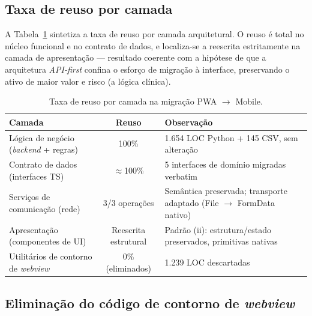 \subsection{Taxa de reuso por camada}

A Tabela~\ref{tab:taxa_reuso} sintetiza a taxa de reuso por camada
arquitetural. O reuso é total no núcleo funcional e no contrato de dados, e
localiza-se a reescrita estritamente na camada de apresentação --- resultado
coerente com a hipótese de que a arquitetura \emph{API-first} confina o esforço
de migração à interface, preservando o ativo de maior valor e risco (a lógica
clínica).

\begin{table}[H]
\centering
\caption{Taxa de reuso por camada na migração PWA $\rightarrow$ Mobile.}
\label{tab:taxa_reuso}
\footnotesize
\begin{tabular}{|p{4.6cm}|c|p{5.2cm}|}
\hline
\textbf{Camada} & \textbf{Reuso} & \textbf{Observação} \\ \hline
Lógica de negócio (\emph{backend} + regras) & 100\% & 1.654 LOC Python + 145 CSV, sem alteração \\ \hline
Contrato de dados (interfaces TS) & $\approx$100\% & 5 interfaces de domínio migradas verbatim \\ \hline
Serviços de comunicação (rede) & 3/3 operações & Semântica preservada; transporte adaptado (File $\rightarrow$ FormData nativo) \\ \hline
Apresentação (componentes de UI) & Reescrita estrutural & Padrão (ii): estrutura/estado preservados, primitivas nativas \\ \hline
Utilitários de contorno de \emph{webview} & 0\% (eliminados) & 1.239 LOC descartadas \\ \hline
\end{tabular}
\end{table}

\subsection{Eliminação do código de contorno de \emph{webview}}

